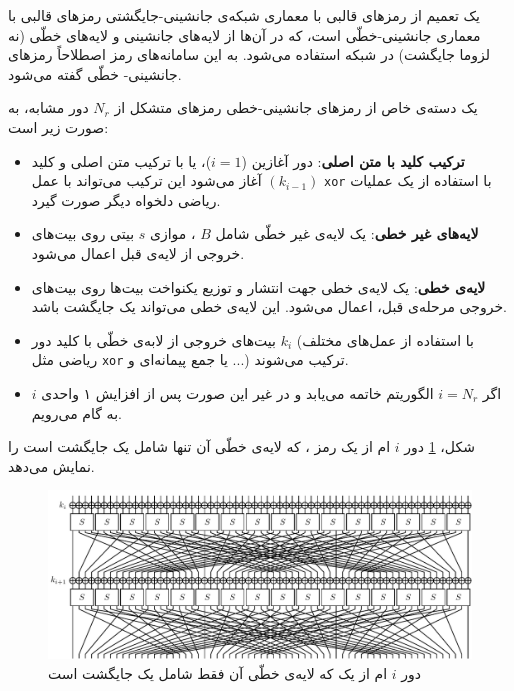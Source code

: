 \begin{definition}
	یک تعمیم از رمزهای قالبی با معماری شبکه‌ی جانشینی-جایگشتی رمزهای قالبی با معماری جانشینی-خطّی 
	است، که در آن‌ها از لایه‌های جانشینی و لایه‌های خطّی (نه لزوما جایگشت) در شبکه استفاده می‌شود. به این سامانه‌های رمز  اصطلاحاً 
 رمزهای جانشینی- خطّی گفته می‌شود.
\end{definition} 

  \begin{definition}
  	یک دسته‌ی خاص از رمزهای جانشینی-خطی رمزهای 
  	متشکل از 
  	$N_{r}$
  	دور مشابه، به صورت زیر است:
 \begin{itemize}
  		\item[\lr{\textbf{X}}]
  		\textbf{ ترکیب کلید با متن اصلی}:
  		دور آغازین 
  		($i = 1$)،
  		یا با ترکیب متن اصلی و کلید 
  		$(k_{i-1})$
  		آغاز می‌شود این ترکیب می‌تواند با عمل 
  		\verb|xor|
  		 با استفاده از یک عملیات ریاضی دلخواه دیگر صورت گیرد.
  		\item[\lr{\textbf{S}}]
  		\textbf{لایه‌های غیر خطی}:
  		یک لایه‌ی غیر خطّی شامل 
  		$B$
  		، 
  		موازی 
  		$s$
  		بیتی روی بیت‌های خروجی از لایه‌ی قبل اعمال می‌شود.
  		\item[\lr{\textbf{L}}]
  		\textbf{لایه‌ی خطی}:
  		یک  لایه‌ی خطی جهت انتشار و توزیع یکنواخت بیت‌ها روی بیت‌های  خروجی مرحله‌ی قبل، اعمال می‌شود. این لایه‌ی خطی می‌تواند یک جایگشت باشد.
  		\item[\lr{\textbf{X}}]
  		بیت‌های خروجی از لابه‌ی خطّی با کلید دور 
  		$k_{i}$
  		(با استفاده از عمل‌های مختلف ریاضی مثل 
  		\verb|xor|
  		 یا جمع پیمانه‌ای و ...) ترکیب می‌شوند.
  		\item
  		اگر 
  		$i = N_{r}$
  		الگوریتم خاتمه می‌یابد و در غیر این صورت پس از افزایش ۱ واحدی 
  		$i$
  		به گام 
  		می‌رویم.
\end{itemize}
  	شکل، 
  	\ref{fig:BlockCipher2}
  	دور 
  	$i$
  	ام از یک رمز 
  	، 
  	که لایه‌ی خطّی آن تنها شامل یک جایگشت است را نمایش می‌دهد.
\end{definition}
\begin{figure}[h]
  	\centering
  	\includegraphics[width=0.7\linewidth]{Images/sa_cipher}
  	\caption{
  		{\footnotesize دور 
  		$i$ 
  		ام از یک 
  		که لایه‌ی خطّی آن فقط شامل یک جایگشت است}}
  	\label{fig:BlockCipher2}
\end{figure}
  
